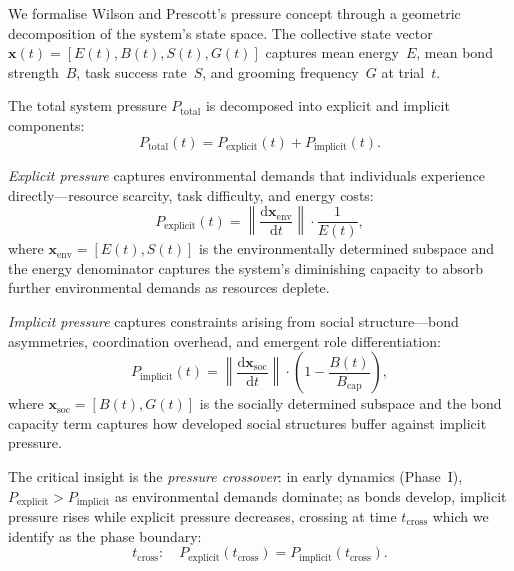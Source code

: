 \documentclass[12pt]{article}
\begin{document}
We formalise Wilson and Prescott's \cite{wilson2022} pressure concept through a geometric decomposition of the system's state space. The collective state vector $\mathbf{x}(t) = [E(t), B(t), S(t), G(t)]$ captures mean energy~$E$, mean bond strength~$B$, task success rate~$S$, and grooming frequency~$G$ at trial~$t$.

The total system pressure $P_\mathrm{total}$ is decomposed into explicit and implicit components:
\begin{equation}
P_\mathrm{total}(t) = P_\mathrm{explicit}(t) + P_\mathrm{implicit}(t).
\label{eq:ptotal}
\end{equation}

\emph{Explicit pressure} captures environmental demands that individuals experience directly---resource scarcity, task difficulty, and energy costs:
\begin{equation}
P_\mathrm{explicit}(t) = \left\| \frac{\mathrm{d}\mathbf{x}_\mathrm{env}}{\mathrm{d}t} \right\| \cdot \frac{1}{E(t)},
\label{eq:pexplicit}
\end{equation}
where $\mathbf{x}_\mathrm{env} = [E(t), S(t)]$ is the environmentally determined subspace and the energy denominator captures the system's diminishing capacity to absorb further environmental demands as resources deplete.

\emph{Implicit pressure} captures constraints arising from social structure---bond asymmetries, coordination overhead, and emergent role differentiation:
\begin{equation}
P_\mathrm{implicit}(t) = \left\| \frac{\mathrm{d}\mathbf{x}_\mathrm{soc}}{\mathrm{d}t} \right\| \cdot \left(1 - \frac{B(t)}{B_\mathrm{cap}}\right),
\label{eq:pimplicit}
\end{equation}
where $\mathbf{x}_\mathrm{soc} = [B(t), G(t)]$ is the socially determined subspace and the bond capacity term captures how developed social structures buffer against implicit pressure.

The critical insight is the \emph{pressure crossover}: in early dynamics (Phase~I), $P_\mathrm{explicit} > P_\mathrm{implicit}$ as environmental demands dominate; as bonds develop, implicit pressure rises while explicit pressure decreases, crossing at time $t_\mathrm{cross}$ which we identify as the phase boundary:
\begin{equation}
t_\mathrm{cross}: \quad P_\mathrm{explicit}(t_\mathrm{cross}) = P_\mathrm{implicit}(t_\mathrm{cross}).
\label{eq:tcross}
\end{equation}
\end{document}
